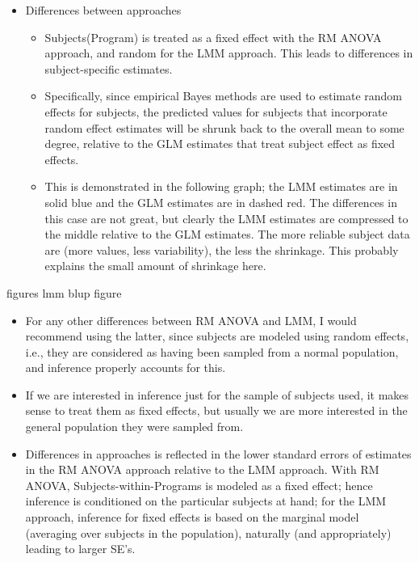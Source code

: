 \documentclass[
  9pt,
  ignorenonframetext,
]{beamer}
\begin{document}
\begin{frame}{}
\protect\hypertarget{section-6}{}
\begin{itemize}
\item
  Differences between approaches

  \begin{itemize}
  \item
    Subjects(Program) is treated as a fixed effect with the RM ANOVA
    approach, and random for the LMM approach. This leads to differences
    in subject-specific estimates.
  \item
    Specifically, since empirical Bayes methods are used to estimate
    random effects for subjects, the predicted values for subjects that
    incorporate random effect estimates will be shrunk back to the
    overall mean to some degree, relative to the GLM estimates that
    treat subject effect as fixed effects.
  \item
    This is demonstrated in the following graph; the LMM estimates are
    in solid blue and the GLM estimates are in dashed red. The
    differences in this case are not great, but clearly the LMM
    estimates are compressed to the middle relative to the GLM
    estimates. The more reliable subject data are (more values, less
    variability), the less the shrinkage. This probably explains the
    small amount of shrinkage here.
  \end{itemize}
\end{itemize}
\end{frame}

\begin{frame}{figures}
\protect\hypertarget{figures}{}
\alert {lmm blup figure}
\end{frame}

\begin{frame}{}
\protect\hypertarget{section-7}{}
\begin{itemize}
\item
  For any other differences between RM ANOVA and LMM, I would recommend
  using the latter, since subjects are modeled using random effects,
  i.e., they are considered as having been sampled from a normal
  population, and inference properly accounts for this.
\item
  If we are interested in inference just for the sample of subjects
  used, it makes sense to treat them as fixed effects, but usually we
  are more interested in the general population they were sampled from.
\item
  Differences in approaches is reflected in the lower standard errors of
  estimates in the RM ANOVA approach relative to the LMM approach. With
  RM ANOVA, Subjects-within-Programs is modeled as a fixed effect; hence
  inference is conditioned on the particular subjects at hand; for the
  LMM approach, inference for fixed effects is based on the marginal
  model (averaging over subjects in the population), naturally (and
  appropriately) leading to larger SE's.
\end{itemize}
\end{frame}
\end{document}
